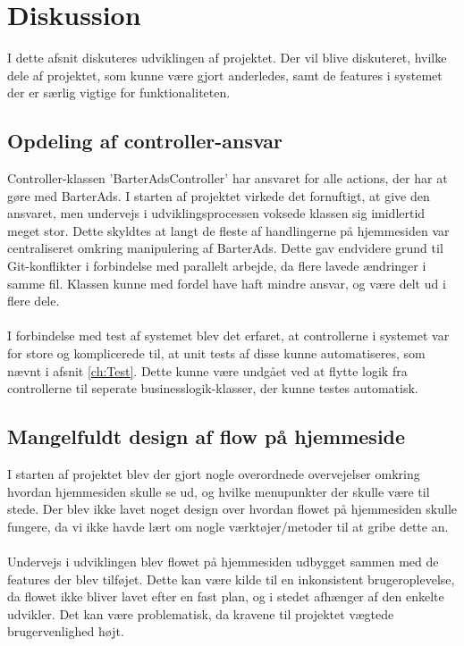 \chapter{Diskussion}
I dette afsnit diskuteres udviklingen af projektet. Der vil blive diskuteret, hvilke dele af projektet, som kunne være gjort anderledes, samt de features i systemet der er særlig vigtige for funktionaliteten.

\section{Opdeling af controller-ansvar}
Controller-klassen 'BarterAdsController' har ansvaret for alle actions, der har at gøre med BarterAds. I starten af projektet virkede det fornuftigt, at give den ansvaret, men undervejs i udviklingsprocessen voksede klassen sig imidlertid meget stor. Dette skyldtes at langt de fleste af handlingerne på hjemmesiden var centraliseret omkring manipulering af BarterAds. Dette gav endvidere grund til Git-konflikter i forbindelse med parallelt arbejde, da flere lavede ændringer i samme fil. Klassen kunne med fordel have haft mindre ansvar, og være delt ud i flere dele.\\ \\
\noindent I forbindelse med test af systemet blev det erfaret, at controllerne i systemet var for store og komplicerede til, at unit tests af disse kunne automatiseres, som nævnt i afsnit \ref{ch:Test}. Dette kunne være undgået ved at flytte logik fra controllerne til seperate businesslogik-klasser, der kunne testes automatisk.

\section{Mangelfuldt design af flow på hjemmeside}
I starten af projektet blev der gjort nogle overordnede overvejelser omkring hvordan hjemmesiden skulle se ud, og hvilke menupunkter der skulle være til stede. Der blev ikke lavet noget design over hvordan flowet på hjemmesiden skulle fungere, da vi ikke havde lært om nogle værktøjer/metoder til at gribe dette an. \\ \\
\noindent Undervejs i udviklingen blev flowet på hjemmesiden udbygget sammen med de features der blev tilføjet. Dette kan være kilde til en inkonsistent brugeroplevelse, da flowet ikke bliver lavet efter en fast plan, og i stedet afhænger af den enkelte udvikler. Det kan være problematisk, da kravene til projektet vægtede brugervenlighed højt.\\ \\

